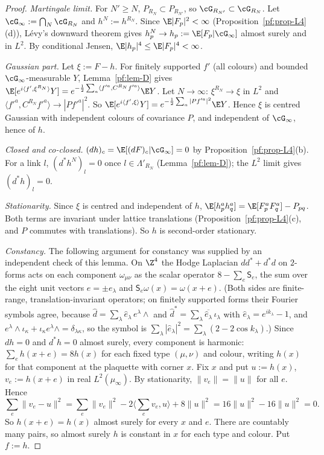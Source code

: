 \begin{proof}
\emph{Martingale limit.} For $N'\ge N$, $P_{R_N}\subset P_{R_{N'}}$, so $\cG_{R_{N'}}\subset\cG_{R_N}$. Let $\cG_\infty:=\bigcap_N\cG_{R_N}$ and $h^N:=h^{R_N}$. Since $\E|F_p|^2<\infty$ (Proposition~\ref{pf:prop-L4}(d)), L\'evy's downward theorem gives $h^N_p\to h_p:=\E[F_p|\cG_\infty]$ almost surely and in $L^2$. By conditional Jensen, $\E|h_p|^4\le\E|F_p|^4<\infty$.

\emph{Gaussian part.} Let $\xi:=F-h$. For finitely supported $f'$ (all colours) and bounded $\cG_\infty$-measurable $Y$, Lemma~\ref{pf:lem-D} gives $\E[e^{i\langle f',\xi^{R_N}\rangle}Y]=e^{-\frac12\sum_a\langle f'^a,C^{R_N}f'^a\rangle}\E Y$. Let $N\to\infty$: $\xi^{R_N}\to\xi$ in $L^2$ and $\langle f'^a,C^{R_N}f'^a\rangle\to|Pf'^a|^2$. So $\E[e^{i\langle f',\xi\rangle}Y]=e^{-\frac12\sum_a|Pf'^a|^2}\E Y$. Hence $\xi$ is centred Gaussian with independent colours of covariance $P$, and independent of $\cG_\infty$, hence of $h$.

\emph{Closed and co-closed.} $(dh)_c=\E[(dF)_c|\cG_\infty]=0$ by Proposition~\ref{pf:prop-L4}(b). For a link $l$, $(d^*h^{N})_l=0$ once $l\in\Lambda'_{R_N}$ (Lemma~\ref{pf:lem-D}); the $L^2$ limit gives $(d^*h)_l=0$.

\emph{Stationarity.} Since $\xi$ is centred and independent of $h$, $\E[h^a_ph^a_q]=\E[F^a_pF^a_q]-P_{pq}$. Both terms are invariant under lattice translations (Proposition~\ref{pf:prop-L4}(c), and $P$ commutes with translations). So $h$ is second-order stationary.

\emph{Constancy.} The following argument for constancy was supplied by an independent check of this lemma. On $\Z^4$ the Hodge Laplacian $dd^*+d^*d$ on $2$-forms acts on each component $\omega_{\mu\nu}$ as the scalar operator $8-\sum_{e}\mathsf S_e$, the sum over the eight unit vectors $e=\pm e_\lambda$ and $\mathsf S_e\omega(x)=\omega(x+e)$. (Both sides are finite-range, translation-invariant operators; on finitely supported forms their Fourier symbols agree, because $\hat d=\sum_\lambda\hat e_\lambda\,e^\lambda\wedge$ and $\hat d^*=\sum_\lambda\overline{\hat e_\lambda}\,\iota_\lambda$ with $\hat e_\lambda=e^{ik_\lambda}-1$, and $e^\lambda\wedge\iota_\kappa+\iota_\kappa e^\lambda\wedge=\delta_{\lambda\kappa}$, so the symbol is $\sum_\lambda|\hat e_\lambda|^2=\sum_\lambda(2-2\cos k_\lambda)$.) Since $dh=0$ and $d^*h=0$ almost surely, every component is harmonic: $\sum_eh(x+e)=8h(x)$ for each fixed type $(\mu,\nu)$ and colour, writing $h(x)$ for that component at the plaquette with corner $x$. Fix $x$ and put $u:=h(x)$, $v_e:=h(x+e)$ in real $L^2(\mu_\infty)$. By stationarity, $\|v_e\|=\|u\|$ for all $e$. Hence
\[
\sum_e\|v_e-u\|^2=\sum_e\|v_e\|^2-2\Big\langle\sum_ev_e,u\Big\rangle+8\|u\|^2=16\|u\|^2-16\|u\|^2=0 .
\]
So $h(x+e)=h(x)$ almost surely for every $x$ and $e$. There are countably many pairs, so almost surely $h$ is constant in $x$ for each type and colour. Put $f:=h$.
\end{proof}

